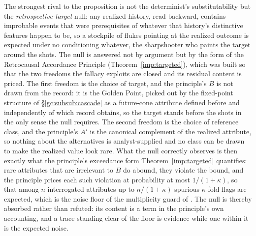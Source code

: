 \begin{remark}
\label{gc:rem:sharpshooter}
The strongest rival to the proposition is not the determinist's
substitutability but the \emph{retrospective-target} null: any
realized history, read backward, contains improbable events that were
prerequisites of whatever that history's distinctive features happen
to be, so a stockpile of flukes pointing at the realized outcome is
expected under no conditioning whatever, the sharpshooter who paints
the target around the shots. The null is answered not by argument but
by the form of the Retrocausal Accordance Principle
(Theorem~\ref{imp:targeted}), which was built so that the
two freedoms the fallacy exploits are closed and its residual content
is priced. The first freedom is the choice of target, and the
principle's $B$ is not drawn from the record: it is the Golden Point,
picked out by the fixed-point structure of \S\ref{gc:subsub:cascade}
as a future-cone attribute defined before and independently of which
record obtains, so the target stands before the shots in the only
sense the null requires. The second freedom is the choice of
reference class, and the principle's $A'$ is the canonical complement
of the realized attribute, so nothing about the alternatives is
analyst-supplied and no class can be drawn to make the realized value
look rare. What the null correctly observes is then exactly what the
principle's exceedance form Theorem~\ref{imp:targeted} quantifies:
rare attributes that are irrelevant to $B$ do abound, they violate the
bound, and the principle prices each such violation at probability at
most $1/(1+\kappa)$, so that among $n$ interrogated attributes up to
$n/(1+\kappa)$ spurious $\kappa$-fold flags are expected, which is the
noise floor of the multiplicity guard of \cite{GoldenTargeted}. The null is thereby
absorbed rather than refuted: its content is a term in the
principle's own accounting, and a trace standing clear of the floor
is evidence while one within it is the expected noise.


\end{remark}

